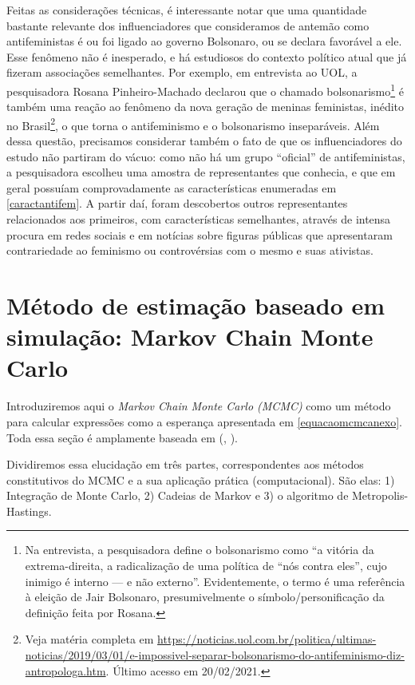 \documentclass[
	12pt,				%
	openright,			%
	twoside,			%
	a4paper,			%
	english,			%
	brazil				%
	]{abntex2}
\begin{document}
\begin{anexosenv}
 Feitas as considerações técnicas, é interessante notar que uma quantidade bastante relevante dos influenciadores que consideramos de antemão como antifeministas é ou foi ligado ao governo Bolsonaro, ou se declara favorável a ele. Esse fenômeno não é inesperado, e há estudiosos do contexto político atual que já fizeram associações semelhantes. Por exemplo, em entrevista ao UOL, a pesquisadora Rosana Pinheiro-Machado declarou que o chamado bolsonarismo\footnote{Na entrevista, a pesquisadora define o bolsonarismo como ``a vitória da extrema-direita, a radicalização de uma política de ``nós contra eles'', cujo inimigo é interno --- e não externo''. Evidentemente, o termo é uma referência à eleição de Jair Bolsonaro, presumivelmente o símbolo/personificação da definição feita por Rosana.} é também uma reação ao fenômeno da nova geração de meninas feministas, inédito no Brasil\footnote{Veja matéria completa em \url{https://noticias.uol.com.br/politica/ultimas-noticias/2019/03/01/e-impossivel-separar-bolsonarismo-do-antifeminismo-diz-antropologa.htm}. Último acesso em 20/02/2021.}, o que torna o antifeminismo e o bolsonarismo inseparáveis. Além dessa questão, precisamos considerar também o fato de que os influenciadores do estudo não partiram do vácuo: como não há um grupo ``oficial'' de antifeministas, a pesquisadora escolheu uma amostra de representantes que conhecia, e que em geral possuíam comprovadamente as características enumeradas em \ref{caractantifem}. A partir daí, foram descobertos outros representantes relacionados aos primeiros, com características semelhantes, através de intensa procura em redes sociais e em notícias sobre figuras públicas que apresentaram contrariedade ao feminismo ou controvérsias com o mesmo e suas ativistas.
 
 \chapter{Método de estimação baseado em simulação: Markov Chain Monte Carlo}\label{mcmc}
 Introduziremos aqui o \emph{Markov Chain Monte Carlo (MCMC)} como um método para calcular expressões como a esperança apresentada em \ref{equacaomcmcanexo}. Toda essa seção é amplamente baseada em (, \citeyear{gilks1996}).

 Dividiremos essa elucidação em três partes, correspondentes aos métodos constitutivos do MCMC e a sua aplicação prática (computacional). São elas: 1) Integração de Monte Carlo, 2) Cadeias de Markov e 3) o algoritmo de Metropolis-Hastings.
 

\end{anexosenv}
\end{document}
